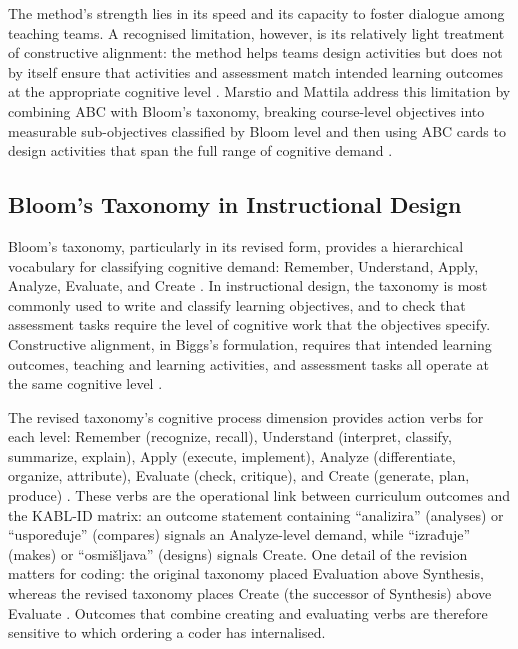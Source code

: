 \documentclass[journal,article,submit,pdftex,moreauthors]{Definitions/mdpi}
\begin{document}
The method's strength lies in its speed and its capacity to foster dialogue among teaching teams. A recognised limitation, however, is its relatively light treatment of constructive alignment: the method helps teams design activities but does not by itself ensure that activities and assessment match intended learning outcomes at the appropriate cognitive level \cite{marstio_2025}. Marstio and Mattila address this limitation by combining ABC with Bloom's taxonomy, breaking course-level objectives into measurable sub-objectives classified by Bloom level and then using ABC cards to design activities that span the full range of cognitive demand \cite{marstio_2025}.

\subsection{Bloom's Taxonomy in Instructional Design}

Bloom's taxonomy, particularly in its revised form, provides a hierarchical vocabulary for classifying cognitive demand: Remember, Understand, Apply, Analyze, Evaluate, and Create \cite{anderson_krathwohl_2001, krathwohl_2002}. In instructional design, the taxonomy is most commonly used to write and classify learning objectives, and to check that assessment tasks require the level of cognitive work that the objectives specify. Constructive alignment, in Biggs's formulation, requires that intended learning outcomes, teaching and learning activities, and assessment tasks all operate at the same cognitive level \cite{biggs_1996}.

The revised taxonomy's cognitive process dimension provides action verbs for each level: Remember (recognize, recall), Understand (interpret, classify, summarize, explain), Apply (execute, implement), Analyze (differentiate, organize, attribute), Evaluate (check, critique), and Create (generate, plan, produce) \cite{anderson_krathwohl_2001}. These verbs are the operational link between curriculum outcomes and the KABL-ID matrix: an outcome statement containing ``analizira'' (analyses) or ``uspoređuje'' (compares) signals an Analyze-level demand, while ``izrađuje'' (makes) or ``osmišljava'' (designs) signals Create. One detail of the revision matters for coding: the original taxonomy placed Evaluation above Synthesis, whereas the revised taxonomy places Create (the successor of Synthesis) above Evaluate \cite{bloom_1956, krathwohl_2002}. Outcomes that combine creating and evaluating verbs are therefore sensitive to which ordering a coder has internalised.
\end{document}
